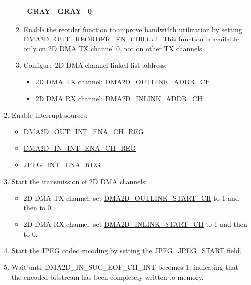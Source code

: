 \documentclass[main\_\_EN.tex]{subfiles}
\begin{document}
\begin{enumerate}
\begin{enumerate}
\begin{longtable}{ | c | c | c | }
        GRAY  &  GRAY &  0 \\ \hline
        \end{longtable}
        \item Enable the reorder function to improve bandwidth utilization by setting \hyperref[fielddesc:DMA2DOUTREORDERENCH0]{DMA2D\_OUT\_REORDER\_EN\_CH0} to 1. This function is available only on 2D DMA TX channel 0, not on other TX channels.
        \item Configure 2D DMA channel linked list address:
        \begin{itemize}
            \item 2D DMA TX channel: \hyperref[fielddesc:DMA2DOUTLINKADDRCHN]{DMA2D\_OUTLINK\_ADDR\_CH}
            \item 2D DMA RX channel: \hyperref[fielddesc:DMA2DINLINKADDRCHN]{DMA2D\_INLINK\_ADDR\_CH}
        \end{itemize}
    \end{enumerate}
    \item Enable interrupt sources:
    \begin{itemize}
        \item \hyperref[regdesc:DMA2DOUTINTENACHNREG]{DMA2D\_OUT\_INT\_ENA\_CH\_REG}
        \item \hyperref[regdesc:DMA2DININTENACHNREG]{DMA2D\_IN\_INT\_ENA\_CH\_REG}
        \item \hyperref[regdesc:JPEGINTENAREG]{JPEG\_INT\_ENA\_REG}
    \end{itemize}
    \item Start the transmission of 2D DMA channels:
    \begin{itemize}
        \item 2D DMA TX channel: set \hyperref[fielddesc:DMA2DOUTLINKSTARTCHN]{DMA2D\_OUTLINK\_START\_CH} to 1 and then to 0.
        \item 2D DMA RX channel: set \hyperref[fielddesc:DMA2DINLINKSTARTCHN]{DMA2D\_INLINK\_START\_CH} to 1 and then to 0.
    \end{itemize}
    \item Start the JPEG codec encoding by setting the \hyperref[fielddesc:JPEGJPEGSTART]{JPEG\_JPEG\_START} field.
    \item Wait until DMA2D\_IN\_SUC\_EOF\_CH\_INT becomes 1, indicating that the encoded bitstream has been completely written to memory.
\end{enumerate}
\end{document}
